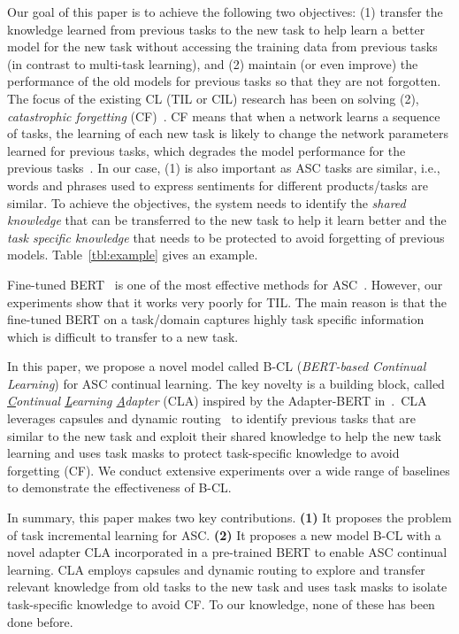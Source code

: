\documentclass[11pt]{article}
\begin{document}
Our goal of this paper is to achieve the following two objectives: (1) transfer the knowledge learned from previous tasks to the new task to help learn a better model for the new task without accessing the training data from previous tasks (in contrast to multi-task learning), and (2) maintain (or even improve) the performance of the old models for previous tasks so that they are not forgotten. 
The focus of the existing CL (TIL or CIL) research has been on solving (2),  \textit{catastrophic forgetting} (CF)~\cite{chen2018lifelong,ke2020ContinualMix}. CF means that when a network learns a sequence of tasks, the learning of each new task is likely to change the network parameters learned for previous tasks, which degrades the model performance for the previous tasks~\cite{mccloskey1989catastrophic}.
In our case, (1) is also important as ASC tasks are similar, i.e., words and phrases used to express sentiments for different products/tasks are similar.
To achieve the objectives, the system needs to identify the \textit{shared knowledge} that can be transferred to the new task to help it learn better and the \textit{task specific knowledge} that needs to be protected to avoid forgetting of previous models.  Table~\ref{tbl:example} gives an example.  



Fine-tuned BERT~\cite{DBLP:conf/naacl/DevlinCLT19} is one of the most effective methods for ASC~\cite{DBLP:conf/naacl/XuLSY19,sun-etal-2019-utilizing}. However, our experiments show that it works very poorly for TIL. The main reason is that the fine-tuned BERT on a task/domain captures highly task specific information which is difficult to transfer to a new task. 

In this paper, we propose a novel model called B-CL (\textit{BERT-based Continual Learning}) for ASC continual learning. The key novelty is a building block, called \textit{\underline{C}ontinual \underline{L}earning \underline{A}dapter} (CLA) inspired by the Adapter-BERT in~\cite{DBLP:conf/icml/HoulsbyGJMLGAG19}.~CLA leverages capsules and dynamic routing~\cite{sabour2017dynamic} to identify previous tasks that are similar to the new task and exploit their shared knowledge to help the new task learning and uses task masks to protect task-specific knowledge to avoid forgetting (CF). We conduct extensive experiments over a wide range of baselines to demonstrate the effectiveness of B-CL. 

In summary, this paper makes two key contributions. \textbf{(1)} 
It proposes the problem of task incremental learning for ASC.
    \textbf{(2)} It proposes a new model B-CL with a novel adapter CLA incorporated in a pre-trained BERT to enable ASC continual learning. CLA employs capsules and dynamic routing to explore and transfer relevant knowledge from old tasks to the new task and uses task masks to isolate task-specific knowledge to avoid CF. To our knowledge, none of these has been done before. 
\end{document}
